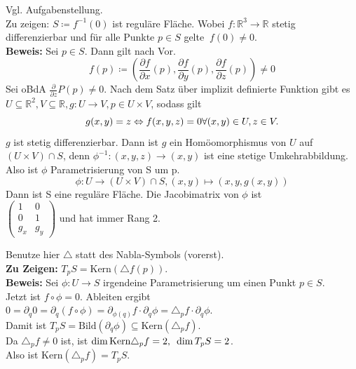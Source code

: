 \begin{problem*}[1a]
  Vgl. Aufgabenstellung. \\
  Zu zeigen: \( S \coloneqq f^{-1}(0) \) ist reguläre Fläche. Wobei \( f: \mathbb{R}^3 \to \mathbb{R} \) stetig differenzierbar und für alle Punkte \( p \in S \) gelte \( \ f(0) \neq 0 \). \\
  \textbf{Beweis:} Sei \( p \in S \). Dann gilt nach Vor.
  \begin{equation*}
    f(p) \coloneqq \left(\frac{\partial f}{\partial x}(p), 
    \frac{\partial f}{\partial y}(p), 
    \frac{\partial f}{\partial z}(p) \right) \neq 0
  \end{equation*}
  Sei oBdA \( \frac{\partial}{\partial z} P(p) \neq 0 \). Nach dem Satz über implizit definierte Funktion gibt es\\
  \( U \subseteq \mathbb{R}^2, V \subseteq \mathbb{R}, g: U \to V, p \in U \times V \), sodass gilt\\
  \begin{equation*}
    g(x,y) = z \Leftrightarrow f(x,y,z) = 0 \hfill \forall (x,y) \in U, z \in V. \\
  \end{equation*}
  \( g \) ist stetig differenzierbar. Dann ist \( g \) ein Homöomorphismus von \( U \) auf \( (U \times V) \cap S \), denn \( \phi^{-1}:(x,y,z) \to (x,y) \) ist eine stetige Umkehrabbildung. \\
  Also ist \( \phi \) Parametrisierung von S um p.
  \begin{equation*}
    \phi: U \to (U \times V) \cap S, (x,y) \mapsto (x,y,g(x,y))
  \end{equation*}
  Dann ist S eine reguläre Fläche.
  Die Jacobimatrix von \( \phi \) ist\\ 
  \( \begin{pmatrix}
    1 & 0 \\
    0 & 1 \\
    g_x & g_y
  \end{pmatrix} \) und hat immer Rang 2.
\end{problem*}

\begin{problem*}[1b] Benutze hier \( \triangle \) statt des Nabla-Symbols (vorerst). \\
  \textbf{Zu Zeigen:} \( T_p S = \text{Kern}(\triangle f(p)) \). \\
  \textbf{Beweis:} Sei \( \phi: U \to S \) irgendeine Parametrisierung um einen Punkt \( p \in S \). \\
  Jetzt ist \( f \circ \phi = 0 \). Ableiten ergibt \\
  \( 0 = \partial_q 0 = \partial_q (f \circ \phi) = \partial_{\phi(q)}f \cdot \partial_q \phi = \triangle_p f \cdot \partial_q \phi \). \\
  Damit ist \( T_p S = \text{Bild}(\partial_q \phi) \subseteq \text{Kern}(\triangle_p f) \). \\
  Da \( \triangle_p f \neq 0 \) ist, ist \( \dim\text{Kern} \triangle_p f = 2\text{,}\enskip \dim T_p S = 2 \). \\
  Also ist \( \text{Kern}(\triangle_p f) = T_pS \).
  
\end{problem*}

